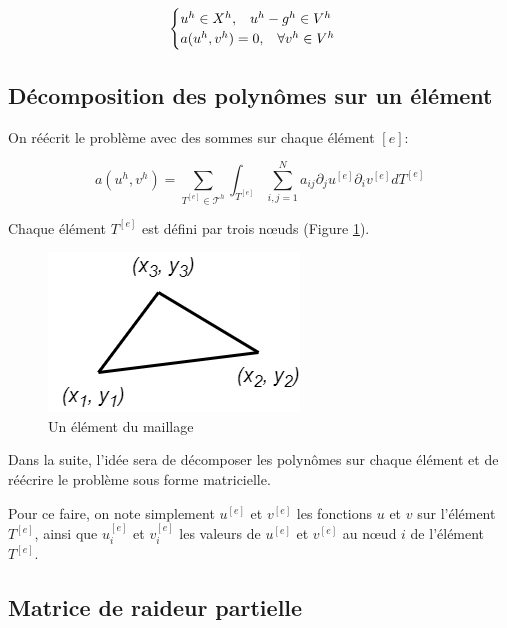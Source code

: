 \documentclass{article}
\begin{document}
\begin{equation}
    \begin{cases}
        u^h \in X^h, \hspace{0.3cm} u^h - g^h \in V^h \\
        a(u^h, v^h) = 0, \hspace{0.3cm} \forall v^h \in V^h
    \end{cases}   
\end{equation}

\newpage

\subsection{Décomposition des polynômes sur un élément}

On réécrit le problème avec des sommes sur chaque élément $[e]$:

\begin{equation}
    a(u^h, v^h) = \sum_{T^{[e]} \in \mathcal{T}^h} \int_{T^{[e]}}
    \sum_{i,j=1}^N a_{ij} \partial_j u ^{[e]} \partial_i v^{[e]} dT^{[e]}
    \label{eq:general_problem}
\end{equation}

Chaque élément $T^{[e]}$ est défini par trois
nœuds (Figure \ref{fig:element}).

\begin{figure}[h]
    \centering
    \includegraphics[scale=0.5]{img/element.png}
    \caption{Un élément du maillage}
    \label{fig:element}
\end{figure}

Dans la suite, l'idée sera de décomposer les polynômes
sur chaque élément et de réécrire le problème sous forme
matricielle.

Pour ce faire, on note simplement $u^{[e]}$ et $v^{[e]}$
les fonctions $u$ et $v$ sur l'élément $T^{[e]}$, ainsi que
$u^{[e]}_i$ et $v^{[e]}_i$ les valeurs de $u^{[e]}$ et $v^{[e]}$
au nœud $i$ de l'élément $T^{[e]}$.

\subsection{Matrice de raideur partielle}
\end{document}
